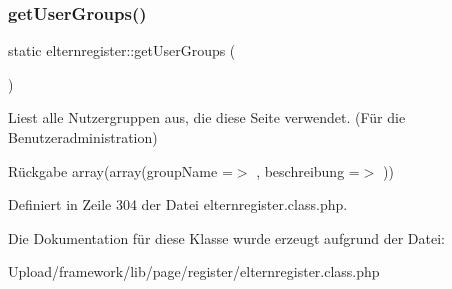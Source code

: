 \subsubsection{\texorpdfstring{get\+User\+Groups()}{getUserGroups()}}
{\footnotesize\ttfamily static elternregister\+::get\+User\+Groups (\begin{DoxyParamCaption}{ }\end{DoxyParamCaption})\hspace{0.3cm}{\ttfamily [static]}}

Liest alle Nutzergruppen aus, die diese Seite verwendet. (Für die Benutzeradministration) \begin{DoxyReturn}{Rückgabe}
array(array(\textquotesingle{}group\+Name\textquotesingle{} =$>$ \textquotesingle{}\textquotesingle{}, \textquotesingle{}beschreibung\textquotesingle{} =$>$ \textquotesingle{}\textquotesingle{})) 
\end{DoxyReturn}


Definiert in Zeile 304 der Datei elternregister.\+class.\+php.



Die Dokumentation für diese Klasse wurde erzeugt aufgrund der Datei\+:\begin{DoxyCompactItemize}
\item 
Upload/framework/lib/page/register/elternregister.\+class.\+php\end{DoxyCompactItemize}

